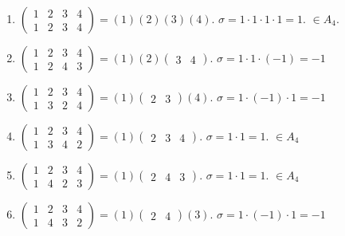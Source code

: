 \documentclass[11pt, a4paper]{article} %
\begin{document}
\begin{enumerate}
    \item $\begin{pmatrix}
        1 &2 &3 &4\\
        1 &2 &3 &4
    \end{pmatrix} = (1)(2)(3)(4)$. $\sigma = 1\cdot 1 \cdot 1 \cdot 1 = 1$. $\in A_4$.
    \item $\begin{pmatrix}
        1 &2 &3 &4\\
        1 &2 &4 &3
    \end{pmatrix} = (1)(2)\begin{pmatrix}3 & 4\end{pmatrix}$.
    $\sigma = 1\cdot 1 \cdot (-1) = -1$

    \item $\begin{pmatrix}
        1 &2 &3 &4\\
        1 &3 &2 &4
    \end{pmatrix} = (1)\begin{pmatrix}2 &3\end{pmatrix}(4)$.
    $\sigma = 1\cdot (-1) \cdot 1 = -1$

    \item $\begin{pmatrix}
        1 &2 &3 &4\\
        1 &3 &4 &2
    \end{pmatrix} = (1)\begin{pmatrix}2 &3 &4\end{pmatrix}$.
    $\sigma = 1\cdot 1 = 1$. $\in A_4$

    \item $\begin{pmatrix}
        1 &2 &3 &4\\
        1 &4 &2 &3
    \end{pmatrix} = (1)\begin{pmatrix}2 &4 &3\end{pmatrix}$.
    $\sigma = 1\cdot 1 = 1$. $\in A_4$

    \item $\begin{pmatrix}
        1 &2 &3 &4\\
        1 &4 &3 &2
    \end{pmatrix} = (1)\begin{pmatrix}2 &4\end{pmatrix}(3)$.
    $\sigma = 1 \cdot (-1) \cdot 1 = -1$


\end{enumerate}
\end{document}
